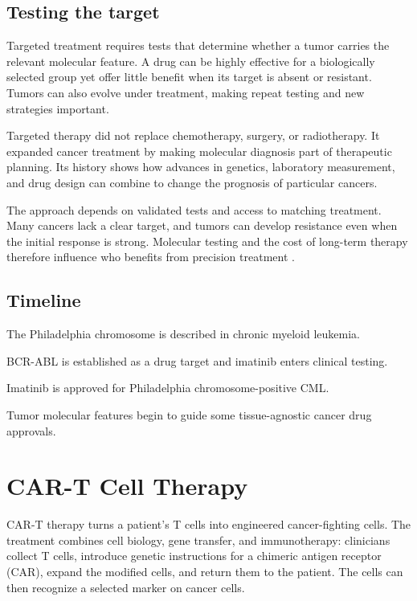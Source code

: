 \documentclass[12pt,oneside]{book}
\begin{document}
\section{Testing the target}
Targeted treatment requires tests that determine whether a tumor carries the relevant molecular feature. A drug can be highly effective for a biologically selected group yet offer little benefit when its target is absent or resistant. Tumors can also evolve under treatment, making repeat testing and new strategies important.

Targeted therapy did not replace chemotherapy, surgery, or radiotherapy. It
expanded cancer treatment by making molecular diagnosis part of therapeutic
planning. Its history shows how advances in genetics, laboratory measurement,
and drug design can combine to change the prognosis of particular cancers.

The approach depends on validated tests and access to matching treatment. Many
cancers lack a clear target, and tumors can develop resistance even when the
initial response is strong. Molecular testing and the cost of long-term
therapy therefore influence who benefits from precision treatment
\cite{nciGleevec}.

\section*{Timeline}
\begin{description}[leftmargin=2.3cm,style=nextline]
  \item[1960] The Philadelphia chromosome is described in chronic myeloid leukemia.
  \item[1990s] BCR-ABL is established as a drug target and imatinib enters clinical testing.
  \item[2001] Imatinib is approved for Philadelphia chromosome-positive CML.
  \item[2017] Tumor molecular features begin to guide some tissue-agnostic cancer drug approvals.
\end{description}
\chapter[CAR-T Cell Therapy]{CAR-T Cell Therapy}

CAR-T therapy turns a patient's T cells into engineered cancer-fighting cells.
The treatment combines cell biology, gene transfer, and immunotherapy:
clinicians collect T cells, introduce genetic instructions for a chimeric
antigen receptor (CAR), expand the modified cells, and return them to the
patient. The cells can then recognize a selected marker on cancer cells.
\end{document}
